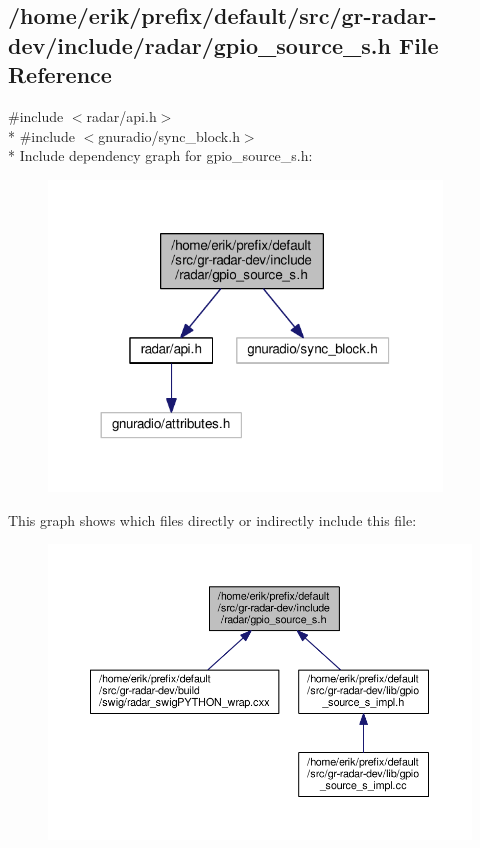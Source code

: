 \subsection{/home/erik/prefix/default/src/gr-\/radar-\/dev/include/radar/gpio\+\_\+source\+\_\+s.h File Reference}
\label{gpio__source__s_8h}
{\ttfamily \#include $<$radar/api.\+h$>$}\\*
{\ttfamily \#include $<$gnuradio/sync\+\_\+block.\+h$>$}\\*
Include dependency graph for gpio\+\_\+source\+\_\+s.\+h\+:
\nopagebreak
\begin{figure}[H]
\begin{center}
\leavevmode
\includegraphics[width=296pt]{de/df1/gpio__source__s_8h__incl}
\end{center}
\end{figure}
This graph shows which files directly or indirectly include this file\+:
\nopagebreak
\begin{figure}[H]
\begin{center}
\leavevmode
\includegraphics[width=350pt]{d2/d26/gpio__source__s_8h__dep__incl}
\end{center}
\end{figure}
